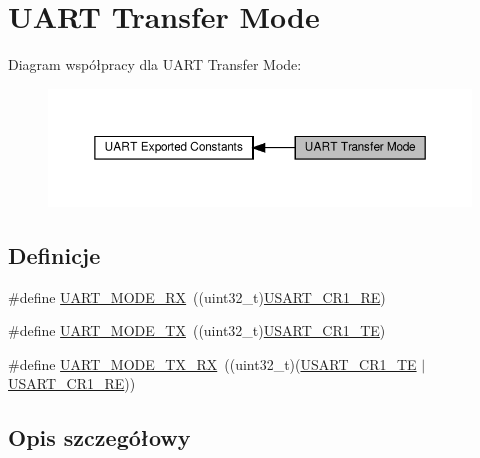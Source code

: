 \hypertarget{group___u_a_r_t___mode}{}\section{U\+A\+RT Transfer Mode}
\label{group___u_a_r_t___mode}
Diagram współpracy dla U\+A\+RT Transfer Mode\+:\nopagebreak
\begin{figure}[H]
\begin{center}
\leavevmode
\includegraphics[width=350pt]{group___u_a_r_t___mode}
\end{center}
\end{figure}
\subsection*{Definicje}
\begin{DoxyCompactItemize}
\item 
\#define \hyperlink{group___u_a_r_t___mode_ga6cdc4e35cd90d15a964994499475e7d7}{U\+A\+R\+T\+\_\+\+M\+O\+D\+E\+\_\+\+RX}~((uint32\+\_\+t)\hyperlink{group___peripheral___registers___bits___definition_gada0d5d407a22264de847bc1b40a17aeb}{U\+S\+A\+R\+T\+\_\+\+C\+R1\+\_\+\+RE})
\item 
\#define \hyperlink{group___u_a_r_t___mode_gad54f095a1073bcd81787d13fc268bd62}{U\+A\+R\+T\+\_\+\+M\+O\+D\+E\+\_\+\+TX}~((uint32\+\_\+t)\hyperlink{group___peripheral___registers___bits___definition_gade7f090b04fd78b755b43357ecaa9622}{U\+S\+A\+R\+T\+\_\+\+C\+R1\+\_\+\+TE})
\item 
\#define \hyperlink{group___u_a_r_t___mode_gab47c162935901e89322e2ce6700b6744}{U\+A\+R\+T\+\_\+\+M\+O\+D\+E\+\_\+\+T\+X\+\_\+\+RX}~((uint32\+\_\+t)(\hyperlink{group___peripheral___registers___bits___definition_gade7f090b04fd78b755b43357ecaa9622}{U\+S\+A\+R\+T\+\_\+\+C\+R1\+\_\+\+TE} $\vert$ \hyperlink{group___peripheral___registers___bits___definition_gada0d5d407a22264de847bc1b40a17aeb}{U\+S\+A\+R\+T\+\_\+\+C\+R1\+\_\+\+RE}))
\end{DoxyCompactItemize}


\subsection{Opis szczegółowy}


